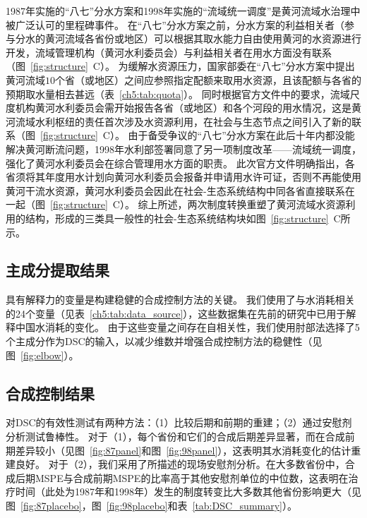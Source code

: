 1987年实施的“八七”分水方案和1998年实施的“流域统一调度”是黄河流域水治理中被广泛认可的里程碑事件。
在“八七”分水方案之前，分水方案的利益相关者（参与分水的黄河流域各省份或地区）可以根据其取水能力自由使用黄河的水资源进行开发，流域管理机构（黄河水利委员会）与利益相关者在用水方面没有联系（图~\ref{fig:structure}~C）。
为缓解水资源压力，国家部委在“八七”分水方案中提出黄河流域$10$个省（或地区）之间应参照指定配额来取用水资源，且该配额与各省的预期取水量相去甚远（表~\ref{ch5:tab:quota}）。
同时根据官方文件中的要求，流域尺度机构黄河水利委员会需开始报告各省（或地区）和各个河段的用水情况，这是黄河流域水利枢纽的责任首次涉及水资源利用，在社会与生态节点之间引入了新的联系（图~\ref{fig:structure}~C）。
由于备受争议的“八七”分水方案在此后十年内都没能解决黄河断流问题，1998年水利部签署同意了另一项制度改革——流域统一调度，强化了黄河水利委员会在综合管理用水方面的职责。
此次官方文件明确指出，各省须将其年度用水计划向黄河水利委员会报备并申请用水许可证，否则不再能使用黄河干流水资源，黄河水利委员会因此在社会-生态系统结构中同各省直接联系在一起（图~\ref{fig:structure}~C）。
综上所述，两次制度转换重塑了黄河流域水资源利用的结构，形成的三类具一般性的社会-生态系统结构块如图~\ref{fig:structure}~C所示。



\subsection{主成分提取结果}

具有解释力的变量是构建稳健的合成控制方法的关键。
我们使用了与水消耗相关的24个变量（见表~\ref{ch5:tab:data_source}），这些数据集在先前的研究中已用于解释中国水消耗的变化\cite{zhou2020}。
由于这些变量之间存在自相关性，我们使用肘部法选择了5个主成分作为DSC的输入，以减少维数并增强合成控制方法的稳健性（见图~\ref{fig:elbow}）。

\subsection{合成控制结果}

对DSC的有效性测试有两种方法：（1）比较后期和前期的重建；（2）通过安慰剂分析测试鲁棒性。
对于（1），每个省份和它们的合成后期差异显著，而在合成前期差异较小（见图~\ref{fig:87panel}和图~\ref{fig:98panel}），这表明其水消耗变化的估计重建良好。
对于（2），我们采用了\cite{abadie2010}所描述的现场安慰剂分析。在大多数省份中，合成后期MSPE与合成前期MSPE的比率高于其他安慰剂单位的中位数，这表明在治疗时间（此处为1987年和1998年）发生的制度转变比大多数其他省份影响更大（见图~\ref{fig:87placebo}，图~\ref{fig:98placebo}和表~\ref{tab:DSC_summary}）。

